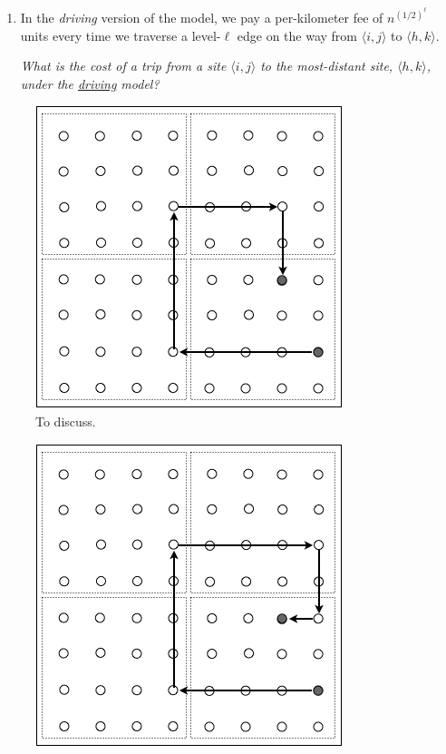\begin{enumerate}
\begin{enumerate}
  \medskip\item
In the {\em driving} version of the model, we pay a per-kilometer fee of $n^{(1/2)^\ell}$ units every time we traverse a level-$\ell$ edge on the way from $\langle i,j \rangle$ to $\langle h,k \rangle$.
 
 \smallskip

{\em What is the cost of a trip from a site $\langle i,j \rangle$ to the most-distant site, $\langle h,k \rangle$, under the \underline{driving} model?}

 \end{enumerate}
 \begin{figure}[hbt]
\begin{center}
       \includegraphics[scale=0.5]{FiguresGraph/routingCitySolution1}
       \caption{To discuss.}
  \label{fig:routingCity}
\end{center}
\end{figure}
 \begin{figure}[hbt]
\begin{center}
       \includegraphics[scale=0.5]{FiguresGraph/routingCity2}

\end{center}
\end{figure}
\end{enumerate}
